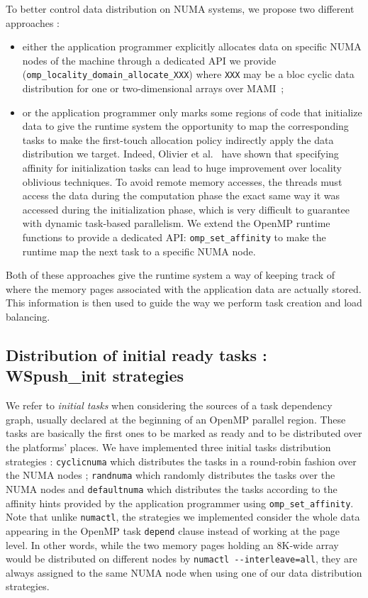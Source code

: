 \documentclass{Styles/llncs}
\begin{document}
To better control data distribution on NUMA systems, we propose two different approaches :
\begin{itemize}
\item either the application programmer explicitly allocates data on specific NUMA nodes of the machine through a dedicated API we provide~\cite{Durand2013} (\verb!omp_locality_domain_allocate_XXX!) where \verb/XXX/ may be a bloc cyclic data distribution for one or two-dimensional arrays over MAMI~\cite{BroFurGogWacNam10IJPP};
\item or the application programmer only marks some regions of code that initialize data to give the runtime system the opportunity to map the corresponding tasks to make the first-touch allocation policy indirectly apply the data distribution we target. Indeed, Olivier et al.~\cite{Olivier:2012:CMW:2388996.2389085}
have shown that specifying affinity for initialization tasks can lead to huge improvement over locality oblivious techniques.
To avoid remote memory accesses, the threads must access the data during the computation phase the exact same way it was accessed during the initialization phase, which is very difficult to guarantee with dynamic task-based parallelism. We extend the OpenMP runtime functions to provide a dedicated API: \verb!omp_set_affinity! to  make the runtime map the next task to a specific NUMA node.
\end{itemize}
Both of these approaches give the runtime system a way of keeping track of where the memory pages associated with the application data are actually stored.
This information is then used to guide the way we perform task creation and load balancing.

\subsection{Distribution of initial ready tasks : WSpush\_init strategies}
We refer to \emph{initial tasks} when considering the sources of a task dependency graph, usually declared at the beginning of an OpenMP parallel region.
These tasks are basically the first ones to be marked as ready and to be distributed over the platforms' places.
We have implemented three initial tasks distribution strategies : \verb!cyclicnuma! which distributes the tasks in a round-robin fashion over the NUMA nodes ; \verb!randnuma! which randomly distributes the tasks over the NUMA nodes and \verb!defaultnuma! which distributes the tasks according to the affinity hints provided by the application programmer using \verb!omp_set_affinity!.
Note that unlike \verb!numactl!, the strategies we implemented consider the whole data appearing in the OpenMP task \verb!depend! clause instead of working at the page level. In other words, while the two memory pages holding an 8K-wide array would be distributed on different nodes by \verb!numactl --interleave=all!, they are always assigned to the same NUMA node when using one of our data distribution strategies.
\end{document}
